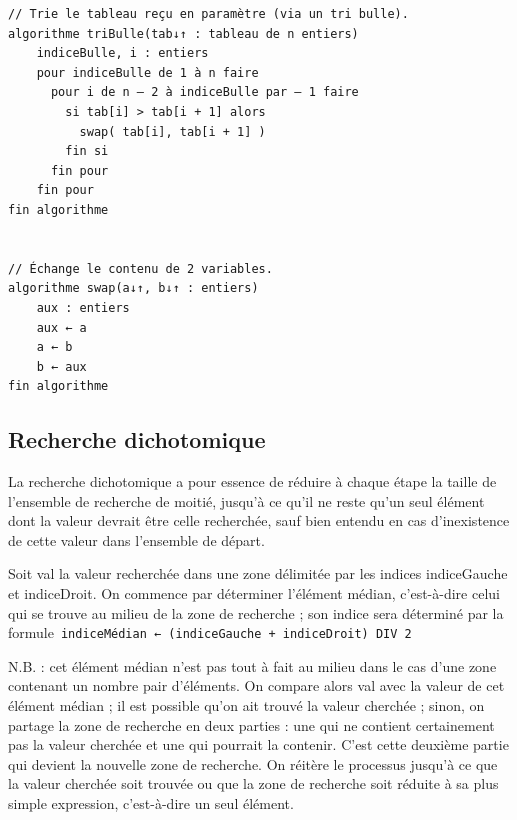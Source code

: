 \documentclass[11pt,a4paper]{article}
\begin{document}
            \par
        \begin{verbatim}
// Trie le tableau reçu en paramètre (via un tri bulle).
algorithme triBulle(tab↓↑ : tableau de n entiers)
    indiceBulle, i : entiers
    pour indiceBulle de 1 à n faire
      pour i de n – 2 à indiceBulle par – 1 faire
        si tab[i] > tab[i + 1] alors
          swap( tab[i], tab[i + 1] )
        fin si
      fin pour
    fin pour
fin algorithme


// Échange le contenu de 2 variables.
algorithme swap(a↓↑, b↓↑ : entiers)
    aux : entiers
    aux ← a
    a ← b
    b ← aux
fin algorithme
\end{verbatim}\subsection{Recherche dichotomique}
		    La recherche dichotomique a pour essence de r\'eduire \`a chaque \'etape la taille de l'ensemble
        de recherche de moiti\'e, jusqu'\`a ce qu'il ne reste qu'un seul \'el\'ement dont la valeur devrait
        \^etre celle recherch\'ee, sauf bien entendu en cas d'inexistence de cette valeur dans l'ensemble
        de d\'epart.
		  
            \par
        
		    Soit val la valeur recherch\'ee dans une zone d\'elimit\'ee par les indices indiceGauche et indiceDroit. 
		    On commence par d\'eterminer l'\'el\'ement m\'edian, c'est-\`a-dire celui qui se trouve \guillemotleft  au
        milieu \guillemotright  de la zone de recherche ; son indice sera d\'etermin\'e par la formule
        \,\verb|indiceMédian ← (indiceGauche + indiceDroit) DIV 2|\,
            \par
        
        N.B. : cet \'el\'ement m\'edian n'est pas tout \`a fait au milieu dans le cas d'une zone contenant un
        nombre pair d'\'el\'ements. On compare alors val avec la valeur de cet \'el\'ement m\'edian ; il est
        possible qu'on ait trouv\'e la valeur cherch\'ee ; sinon, on partage la zone de recherche en deux
        parties : une qui ne contient certainement pas la valeur cherch\'ee et une qui pourrait la
        contenir. C'est cette deuxi\`eme partie qui devient la nouvelle zone de recherche. On r\'eit\`ere
        le processus jusqu'\`a ce que la valeur cherch\'ee soit trouv\'ee ou que la zone de recherche soit
        r\'eduite \`a sa plus simple expression, c'est-\`a-dire un seul \'el\'ement.
		  
\end{document}
